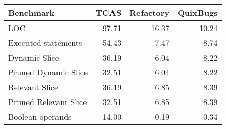 \begin{tabular}{lrrr}
\toprule
\textbf{Benchmark} & \textbf{TCAS} & \textbf{Refactory} & \textbf{QuixBugs} \\
\midrule
LOC & 97.71 & 16.37 & 10.24 \\
Executed statements & 54.43 & 7.47 & 8.74 \\
Dynamic Slice & 36.19 & 6.04 & 8.22 \\
Pruned Dynamic Slice & 32.51 & 6.04 & 8.22 \\
Relevant Slice & 36.19 & 6.85 & 8.39 \\
Pruned Relevant Slice & 32.51 & 6.85 & 8.39 \\
Boolean operands & 14.00 & 0.19 & 0.34 \\
\bottomrule
\end{tabular}
